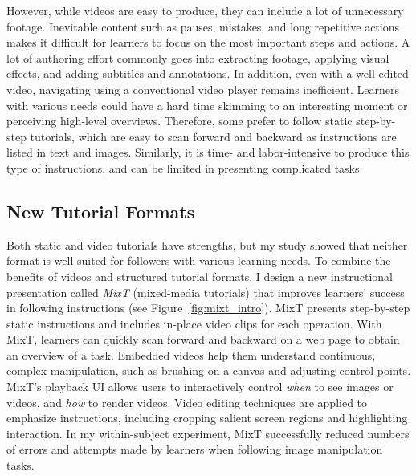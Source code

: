 However, while videos are easy to produce, they can include a lot of unnecessary footage. Inevitable content such as pauses, mistakes, and long repetitive actions makes it difficult for learners to focus on the most important steps and actions. A lot of authoring effort commonly goes into extracting footage, applying visual effects, and adding subtitles and annotations.
%
In addition, even with a well-edited video, navigating using a conventional video player remains inefficient. Learners with various needs could have a hard time skimming to an interesting moment or perceiving high-level overviews. Therefore, some prefer to follow static step-by-step tutorials, which are easy to scan forward and backward as instructions are listed in text and images. Similarly, it is time- and labor-intensive to produce this type of instructions, and can be limited in presenting complicated tasks.



\subsection{New Tutorial Formats}

Both static and video tutorials have strengths, but my study showed that neither format is well suited for followers with various learning needs.
%
To combine the benefits of videos and structured tutorial formats, I design a new instructional presentation called \emph{MixT} (mixed-media tutorials) that improves learners' success in following instructions (see Figure~\ref{fig:mixt_intro}).
%
MixT presents step-by-step static instructions and includes in-place video clips for each operation.
%
With MixT, learners can quickly scan forward and backward on a web page to obtain an overview of a task. Embedded videos help them understand continuous, complex manipulation, such as brushing on a canvas and adjusting control points.
%
MixT's playback UI allows users to interactively control \emph{when} to see images or videos, and \emph{how} to render videos.
%
Video editing techniques are applied to emphasize instructions, including cropping salient screen regions and highlighting interaction.
%
In my within-subject experiment, MixT successfully reduced numbers of errors and attempts made by learners when following image manipulation tasks.

